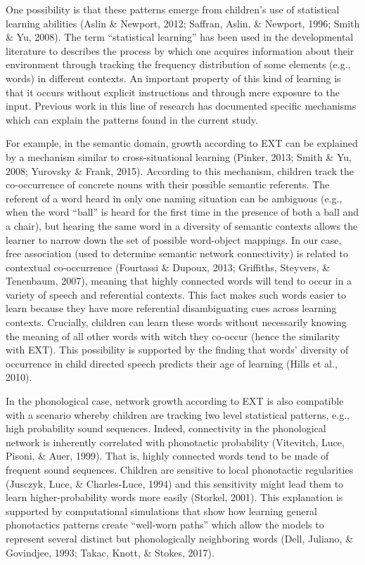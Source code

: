 \documentclass[english,floatsintext,man]{apa6}
\theoremstyle{definition}
\theoremstyle{definition}
\theoremstyle{definition}
\theoremstyle{remark}
\begin{document}
One possibility is that these patterns emerge from children's use of
statistical learning abilities (Aslin \& Newport, 2012; Saffran, Aslin,
\& Newport, 1996; Smith \& Yu, 2008). The term \enquote{statistical
learning} has been used in the developmental literature to describes the
process by which one acquires information about their environment
through tracking the frequency distribution of some elements (e.g.,
words) in different contexts. An important property of this kind of
learning is that it occurs without explicit instructions and through
mere exposure to the input. Previous work in this line of research has
documented specific mechanisms which can explain the patterns found in
the current study.

For example, in the semantic domain, growth according to EXT can be
explained by a mechanism similar to cross-situational learning (Pinker,
2013; Smith \& Yu, 2008; Yurovsky \& Frank, 2015). According to this
mechanism, children track the co-occurrence of concrete nouns with their
possible semantic referents. The referent of a word heard in only one
naming situation can be ambiguous (e.g., when the word \enquote{ball} is
heard for the first time in the presence of both a ball and a chair),
but hearing the same word in a diversity of semantic contexts allows the
learner to narrow down the set of possible word-object mappings. In our
case, free association (used to determine semantic network connectivity)
is related to contextual co-occurrence (Fourtassi \& Dupoux, 2013;
Griffiths, Steyvers, \& Tenenbaum, 2007), meaning that highly connected
words will tend to occur in a variety of speech and referential
contexts. This fact makes such words easier to learn because they have
more referential disambiguating cues across learning contexts.
Crucially, children can learn these words without necessarily knowing
the meaning of all other words with witch they co-occur (hence the
similarity with EXT). This possibility is supported by the finding that
words' diversity of occurrence in child directed speech predicts their
age of learning (Hills et al., 2010).

In the phonological case, network growth according to EXT is also
compatible with a scenario whereby children are tracking lwo level
statistical patterns, e.g., high probability sound sequences. Indeed,
connectivity in the phonological network is inherently correlated with
phonotactic probability (Vitevitch, Luce, Pisoni, \& Auer, 1999). That
is, highly connected words tend to be made of frequent sound sequences.
Children are sensitive to local phonotactic regularities (Jusczyk, Luce,
\& Charles-Luce, 1994) and this sensitivity might lead them to learn
higher-probability words more easily (Storkel, 2001). This explanation
is supported by computational simulations that show how learning general
phonotactics patterns create ``well-worn paths'' which allow the models
to represent several distinct but phonologically neighboring words
(Dell, Juliano, \& Govindjee, 1993; Takac, Knott, \& Stokes, 2017).
\end{document}
